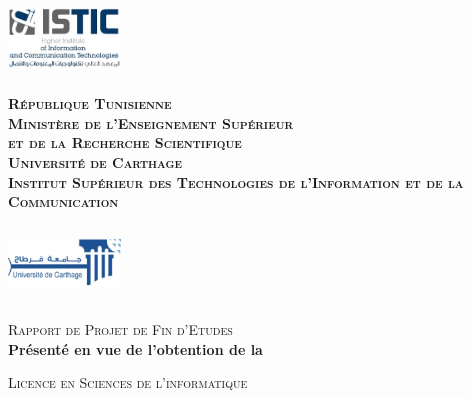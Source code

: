 \begin{titlepage}

\newcommand{\HRule}{\rule{\linewidth}{0.5mm}} %

\center %
 


\begin{minipage}[l]{0.2\columnwidth}
\includegraphics[width=3cm,height=2cm]{../assets/logo_istic.jpg}\\
\end{minipage}
\hfill
\begin{minipage}[l]{0.5\columnwidth}
\centering
\footnotesize
\textbf{\textsc{République Tunisienne}}\\
\textbf{\textsc{Ministère de l'Enseignement Supérieur\\
et de la Recherche Scientifique}}\\
\medskip 
\textbf{\textsc{Université de Carthage}}\\
\medskip 
\textbf{\textsc{Institut Supérieur des Technologies de l'Information et de la Communication}}
\end{minipage}
\hfill
\begin{minipage}[l]{0.2\columnwidth}
\includegraphics[width=3cm,height=2cm]{../assets/logo_ucar.jpg}\\
\end{minipage}

\vskip1cm
\textsc{\large Rapport de Projet de Fin d'Etudes}\\[0.5cm] %

\textbf{Présenté en vue de l'obtention de la}

\textsc{\large Licence en Sciences de l'informatique}\\[0.5cm] %


\end{titlepage}
